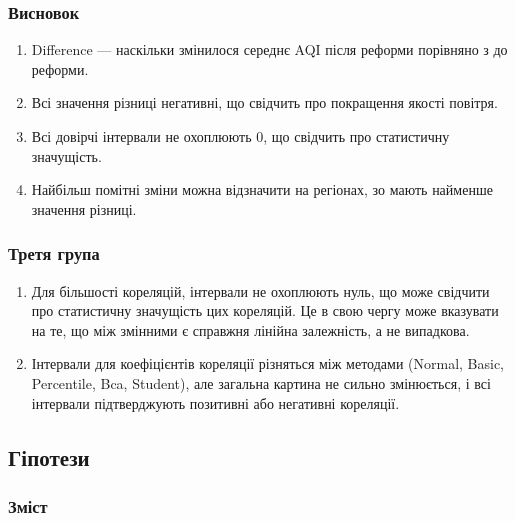 \documentclass{beamer}
\begin{document}
\begin{frame}
  \frametitle{Висновок}

  \begin{enumerate}
    \item  Difference — наскільки змінилося середнє AQI після реформи порівняно з до реформи.
    \item Всі значення різниці негативні, що свідчить про покращення якості повітря.
    \item Всі довірчі інтервали не охоплюють 0, що свідчить про статистичну значущість.
    \item Найбільш помітні зміни можна відзначити на регіонах, зо мають найменше значення різниці.
  
  \end{enumerate}
\end{frame}


\begin{frame}
  \frametitle{Третя група}

  \begin{enumerate}
    \item Для більшості кореляцій, інтервали не охоплюють нуль, що може свідчити про
    статистичну значущість цих кореляцій. Це в свою чергу може вказувати на те,
    що між змінними є справжня лінійна залежність, а не випадкова.
    \item Інтервали для коефіцієнтів кореляції різняться між методами 
    (Normal, Basic, Percentile, Bca, Student), але загальна картина не сильно 
    змінюється, і всі інтервали підтверджують позитивні або негативні кореляції. 
    
  
  \end{enumerate}
\end{frame}


\begin{frame}
  \section{Гіпотези}

  \frametitle{Зміст}
  \tableofcontents[currentsection]
\end{frame}
\end{document}
